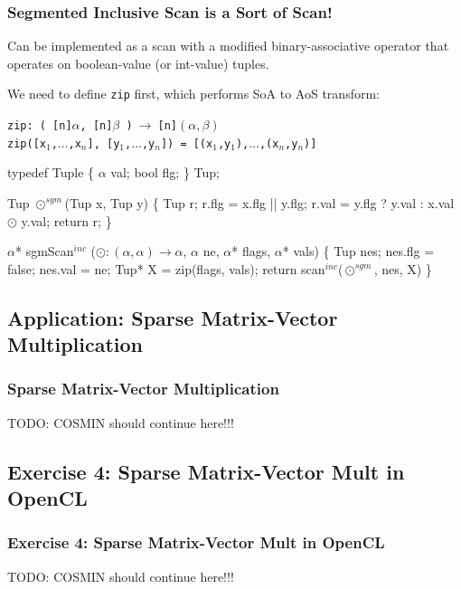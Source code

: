 \documentclass{beamer}
\renewcommand{\emph}[1]{\textcolor{CosGreen}{ #1}}
\newcommand{\emp}[1]{\textcolor{DikuRed}{ #1}}
\newcommand{\mymath}[1]{$ #1 $}
\newcommand{\myindu}[1]{^{#1}}
\begin{document}
\begin{frame}[fragile,t]
  \frametitle{Segmented Inclusive Scan is a Sort of Scan!}
\pause

Can be implemented as a scan with a modified binary-associative
operator that operates on boolean-value (or int-value) tuples. 
\bigskip

We need to define {\tt zip} first, which performs SoA to AoS transform:\\\smallskip
\begin{scriptsize}
\emp{{\tt zip: ( [n]$\alpha$, [n]$\beta$ )$~\rightarrow~$[n]$(\alpha,\beta)$}}\\
\emph{\tt zip([x$_1$,$\ldots$,x$_n$], [y$_1$,$\ldots$,y$_n$])~=~[(x$_1$,y$_1$),$\ldots$,(x$_{n}$,y$_{n}$)]}\\\medskip
\end{scriptsize}
\medskip\pause

\begin{colorcode}[fontsize=\scriptsize]
typedef Tuple \{
    \mymath{\alpha}    val;
    bool flg;
\} Tup;

Tup \mymath{\odot\myindu{sgm}}(Tup x, Tup y) \{
    Tup r;
    r.flg = x.flg || y.flg;
    r.val = y.flg ? y.val : x.val \mymath{\odot} y.val;
    return r;
\}

\mymath{\alpha}* sgmScan\mymath{\myindu{inc}} (\mymath{\odot: (\alpha,\alpha)\to\alpha}, \mymath{\alpha} ne, \mymath{\alpha}* flags, \mymath{\alpha}* vals) \{
    Tup nes; nes.flg = false; nes.val = ne;
    Tup* X = zip(flags, vals);
    return scan\mymath{\myindu{inc}}(\mymath{\odot\myindu{sgm}}, nes, X)
\}
\end{colorcode}

\end{frame}



\subsection{Application: Sparse Matrix-Vector Multiplication}

\begin{frame}[fragile,t]
  \frametitle{Sparse Matrix-Vector Multiplication}

TODO: COSMIN should continue here!!!

\end{frame}

\subsection{Exercise 4: Sparse Matrix-Vector Mult in OpenCL}

\begin{frame}[fragile,t]
  \frametitle{Exercise 4: Sparse Matrix-Vector Mult in OpenCL}

TODO: COSMIN should continue here!!!

\end{frame}
\end{document}
